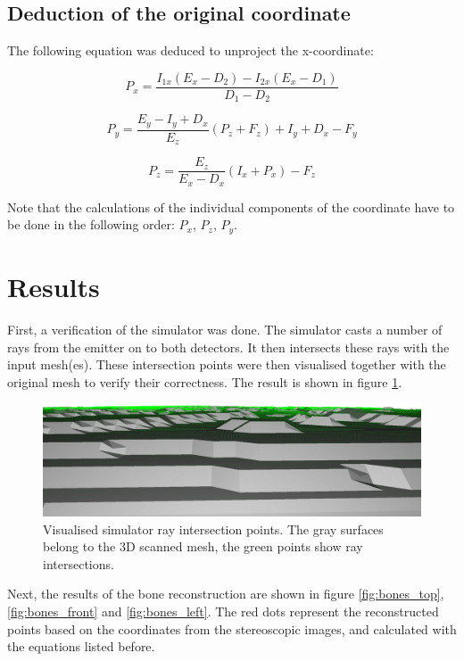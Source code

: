 \subsection{Deduction of the original coordinate}

The following equation was deduced to unproject the x-coordinate:

\begin{equation}
P_x = \frac{I_{1x} (E_x - D_2) - I_{2x} (E_x - D_1)} {D_1 - D_2}
\end{equation}

\begin{equation}
P_y = \frac{E_y - I_y + D_x}{E_z}(P_z + F_z) + I_y + D_x - F_y
\end{equation}

\begin{equation}
P_z = \frac{E_z}{E_x - D_x}(I_x + P_x) - F_z 
\end{equation}

Note that the calculations of the individual components of the coordinate have to be done in the following order: $P_{x}$, $P_{z}$, $P_{y}$. 

\section{Results}
First, a verification of the simulator was done. The simulator casts a number of rays from the emitter on to both detectors. It then intersects these rays with the input mesh(es). These intersection points were then visualised together with the original mesh to verify their correctness. The result is shown in figure \ref{fig:simulator_points}.

\begin{figure}
	\centering
	\includegraphics[width=160mm]{images/fish/rayIntersections.png}
	\caption{Visualised simulator ray intersection points. The gray surfaces belong to the 3D scanned mesh, the green points show ray intersections.}
	\label{fig:simulator_points}
\end{figure}

Next, the results of the bone reconstruction are shown in figure \ref{fig:bones_top}, \ref{fig:bones_front} and \ref{fig:bones_left}. The red dots represent the reconstructed points based on the coordinates from the stereoscopic images, and calculated with the equations listed before.

